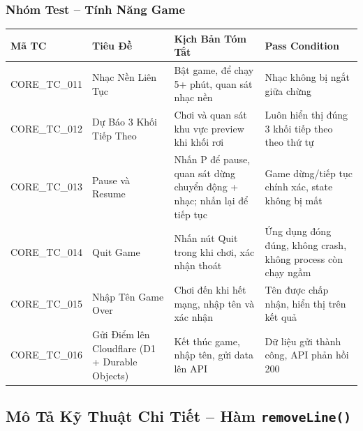 \documentclass[12pt,a4paper]{article}
\begin{document}
\subsubsection{Nhóm Test -- Tính Năng Game}

\begin{table}[H]
\centering
{}
\begin{tabularx}{\linewidth}{|l|X|X|X|}
\hline
\rowcolor{gray!35}
\textbf{Mã TC} & \textbf{Tiêu Đề} & \textbf{Kịch Bản Tóm Tắt} & \textbf{Pass Condition} \\ \hline
CORE\_TC\_011 & Nhạc Nền Liên Tục          & Bật game, để chạy 5+ phút, quan sát nhạc nền & Nhạc không bị ngắt giữa chừng \\ \hline
CORE\_TC\_012 & Dự Báo 3 Khối Tiếp Theo    & Chơi và quan sát khu vực preview khi khối rơi & Luôn hiển thị đúng 3 khối tiếp theo theo thứ tự \\ \hline
CORE\_TC\_013 & Pause và Resume            & Nhấn P để pause, quan sát dừng chuyển động + nhạc; nhấn lại để tiếp tục & Game dừng/tiếp tục chính xác, state không bị mất \\ \hline
CORE\_TC\_014 & Quit Game                  & Nhấn nút Quit trong khi chơi, xác nhận thoát & Ứng dụng đóng đúng, không crash, không process còn chạy ngầm \\ \hline
CORE\_TC\_015 & Nhập Tên Game Over         & Chơi đến khi hết mạng, nhập tên và xác nhận & Tên được chấp nhận, hiển thị trên kết quả \\ \hline
CORE\_TC\_016 & Gửi Điểm lên Cloudflare (D1 + Durable Objects)   & Kết thúc game, nhập tên, gửi data lên API & Dữ liệu gửi thành công, API phản hồi 200 \\ \hline
\end{tabularx}
\end{table}

\subsection{Mô Tả Kỹ Thuật Chi Tiết -- Hàm \texttt{removeLine()}}

\end{document}
